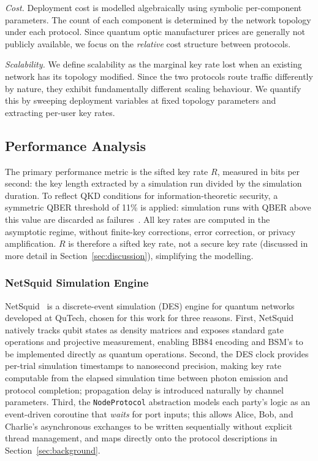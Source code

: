 \documentclass[12pt]{article}
\begin{document}
\textit{Cost.} Deployment cost is modelled algebraically using symbolic per-component parameters. The count of each component is determined by the network topology under each protocol. Since quantum optic manufacturer prices are generally not publicly available, we focus on the \textit{relative} cost structure between protocols.

\textit{Scalability.} We define scalability as the marginal key rate lost when an existing network has its topology modified. Since the two protocols route traffic differently by nature, they exhibit fundamentally different scaling behaviour. We quantify this by sweeping deployment variables at fixed topology parameters and extracting per-user key rates.

\subsection{Performance Analysis}
\label{sec:performance}

The primary performance metric is the sifted key rate $R$, measured in bits per second: the key length extracted by a simulation run divided by the simulation duration. To reflect QKD conditions for information-theoretic security, a symmetric QBER threshold of 11\% is applied: simulation runs with QBER above this value are discarded as failures~\cite{Shor_2000}. All key rates are computed in the asymptotic regime, without finite-key corrections, error correction, or privacy amplification. $R$ is therefore a sifted key rate, not a secure key rate (discussed in more detail in Section~\ref{sec:discussion}), simplifying the modelling.

\subsubsection{NetSquid Simulation Engine}

NetSquid~\cite{Coopmans_2021} is a discrete-event simulation (DES) engine for quantum networks developed at QuTech, chosen for this work for three reasons. First, NetSquid natively tracks qubit states as density matrices and exposes standard gate operations and projective measurement, enabling BB84 encoding and BSM's to be implemented directly as quantum operations. Second, the DES clock provides per-trial simulation timestamps to nanosecond precision, making key rate computable from the elapsed simulation time between photon emission and protocol completion; propagation delay is introduced naturally by channel parameters. Third, the \texttt{NodeProtocol} abstraction models each party's logic as an event-driven coroutine that \textit{waits} for port inputs; this allows Alice, Bob, and Charlie's asynchronous exchanges to be written sequentially without explicit thread management, and maps directly onto the protocol descriptions in Section~\ref{sec:background}.
\end{document}
